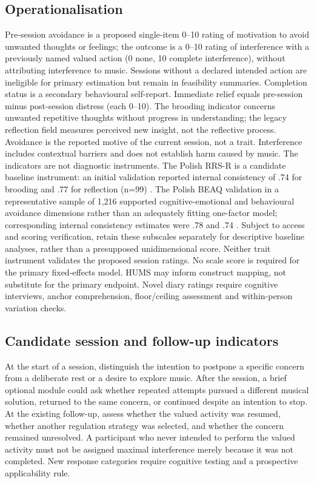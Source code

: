 \documentclass[11pt]{article}
\begin{document}
\subsection{Operationalisation}
Pre-session avoidance is a proposed single-item 0--10 rating of motivation to avoid unwanted thoughts or feelings; the outcome is a 0--10 rating of interference with a previously named valued action (0 none, 10 complete interference), without attributing interference to music. Sessions without a declared intended action are ineligible for primary estimation but remain in feasibility summaries. Completion status is a secondary behavioural self-report. Immediate relief equals pre-session minus post-session distress (each 0--10). The brooding indicator concerns unwanted repetitive thoughts without progress in understanding; the legacy reflection field measures perceived new insight, not the reflective process. Avoidance is the reported motive of the current session, not a trait. Interference includes contextual barriers and does not establish harm caused by music. The indicators are not diagnostic instruments. The Polish RRS-R is a candidate baseline instrument: an initial validation reported internal consistency of .74 for brooding and .77 for reflection (n=99) \citep{kornacka2016}. The Polish BEAQ validation in a representative sample of 1,216 supported cognitive-emotional and behavioural avoidance dimensions rather than an adequately fitting one-factor model; corresponding internal consistency estimates were .78 and .74 \citep{wardeszkiewicz2024}. Subject to access and scoring verification, retain these subscales separately for descriptive baseline analyses, rather than a presupposed unidimensional score. Neither trait instrument validates the proposed session ratings. No scale score is required for the primary fixed-effects model. HUMS may inform construct mapping, not substitute for the primary endpoint. Novel diary ratings require cognitive interviews, anchor comprehension, floor/ceiling assessment and within-person variation checks.

\subsection{Candidate session and follow-up indicators}
At the start of a session, distinguish the intention to postpone a specific concern from a deliberate rest or a desire to explore music. After the session, a brief optional module could ask whether repeated attempts pursued a different musical solution, returned to the same concern, or continued despite an intention to stop. At the existing follow-up, assess whether the valued activity was resumed, whether another regulation strategy was selected, and whether the concern remained unresolved. A participant who never intended to perform the valued activity must not be assigned maximal interference merely because it was not completed. New response categories require cognitive testing and a prospective applicability rule.
\end{document}
